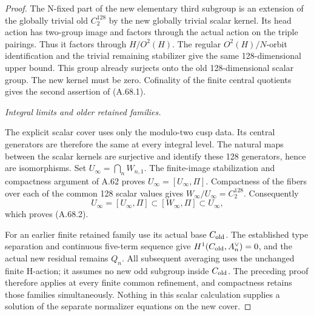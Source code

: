\begin{proof}
The N-fixed part of the new elementary third subgroup is an
extension of the globally trivial old \(C_2^{128}\) by the
new globally trivial scalar kernel. Its head action has two-group
image and factors through the actual action on the triple pairings.
Thus it factors through \(H/O^2(H)\). The regular
\(O^2(H)/N\)-orbit identification and the trivial remaining
stabilizer give the same 128-dimensional upper bound. This group
already surjects onto the old 128-dimensional scalar group.
The new kernel must be zero. Cofinality of the finite central
quotients gives the second assertion of (A.68.1).

\emph{Integral limits and older retained families.}\par
The explicit scalar cover uses only the modulo-two cusp data.
Its central generators are therefore the same at every integral
level. The natural maps between the scalar kernels are surjective
and identify these 128 generators, hence are isomorphisms.
Set \(U_\infty=\bigcap_nW_{n,1}\). The finite-image
stabilization and compactness argument of A.62 proves
\(U_\infty=[U_\infty,\Pi]\). Compactness of the fibers over
each of the common 128 scalar values gives
\(W_\infty/U_\infty=C_2^{128}\). Consequently
\[
 U_\infty=[U_\infty,\Pi]
 \subset[W_\infty,\Pi]\subset U_\infty,
\]
which proves (A.68.2).

For an earlier finite retained family use its actual base
\(C_{\rm old}\). The established type separation and continuous
five-term sequence give \(H^1(C_{\rm old},A_n^\vee)=0\),
and the actual new residual remains \(Q_n\). All subsequent
averaging uses the unchanged finite H-action; it assumes no
new odd subgroup inside \(C_{\rm old}\). The preceding proof
therefore applies at every finite common refinement, and
compactness retains those families simultaneously. Nothing in
this scalar calculation supplies a solution of the separate
normalizer equations on the new cover.
\end{proof}
